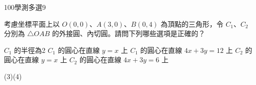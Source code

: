     \begin{QUESTION}
        \begin{ExamInfo}{100}{學測}{多選}{9}
        \end{ExamInfo}
        \begin{ExamAnsRateInfo}{61}{90}{62}{31}
        \end{ExamAnsRateInfo}
        \begin{QBODY}
            考慮坐標平面上以 $O(0,0)$、$A(3,0)$、$B(0,4)$ 為頂點的三角形，令 $C_1$、$C_2$ 分別為 $\triangle OAB$ 的外接圓、內切圓。請問下列哪些選項是正確的？
			\begin{QOPS}
				\QOP $C_1$ 的半徑為2 
				\QOP $C_1$ 的圓心在直線 $y=x$ 上 
				\QOP $C_1$ 的圓心在直線 $4x+3y=12$ 上    
				\QOP $C_2$ 的圓心在直線 $y=x$ 上 \quad 
				\QOP $C_2$ 的圓心在直線 $4x+3y=6$ 上
			\end{QOPS}
        \end{QBODY}
        \begin{QFROMS}
        \end{QFROMS}
        \begin{QTAGS}\end{QTAGS}
        \begin{QANS}
            (3)(4)
        \end{QANS}
        \begin{QSOLLIST}
        \end{QSOLLIST}
        \begin{QEMPTYSPACE}
        \end{QEMPTYSPACE}
    \end{QUESTION}

